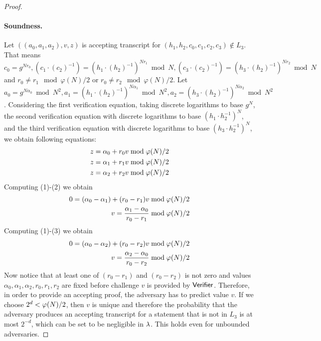 \begin{proof}
\paragraph{Soundness.} Let $((a_0, a_1, a_2), v, z)$ is accepting transcript for $(h_1, h_2, c_0, c_1, c_2, c_3) \notin L_3$. That means $c_0 = g^{Nr_0}, (c_1\cdot (c_2)^{-1}) = (h_1\cdot (h_2)^{-1})^{Nr_1} \bmod N, (c_3\cdot (c_2)^{-1}) = (h_3\cdot (h_2)^{-1})^{Nr_2} \bmod N$ and $r_0 \neq r_1 \mod \varphi(N)/2$ or $r_0 \neq r_2 \mod \varphi(N)/2$. Let $a_0 = g^{N\alpha_0} \bmod N^2, a_1 = (h_1\cdot (h_2)^{-1})^{N\alpha_1} \bmod N^2, a_2 = (h_3\cdot (h_2)^{-1})^{N\alpha_2} \bmod N^2$. Considering the first verification equation, taking discrete logarithms to base $g^N$, the second verification equation with discrete logarithms to base $(h_1 \cdot h_2^{-1})^N$, and the third verification equation with discrete logarithms to base $(h_3 \cdot h_2^{-1})^N$, we obtain following equations:
\begin{align}
z = \alpha_0 + r_0 v \bmod \varphi(N)/2\\
z = \alpha_1 + r_1 v \bmod \varphi(N)/2 \\
z = \alpha_2 + r_2 v \bmod \varphi(N)/2
\end{align}
Computing (1)-(2) we obtain
\begin{align*}
0 = (\alpha_0 - \alpha_1)+ (r_0-r_1)v \bmod \varphi(N)/2 \\
v = \frac{\alpha_1 - \alpha_0}{r_0-r_1} \bmod \varphi(N)/2
\end{align*}
Computing (1)-(3) we obtain
\begin{align*}
0 = (\alpha_0 - \alpha_2)+ (r_0-r_2)v \bmod \varphi(N)/2 \\
v = \frac{\alpha_2 - \alpha_0}{r_0-r_2} \bmod \varphi(N)/2
\end{align*}
Now notice that at least one of $(r_0 - r_1)$ and $(r_0 - r_2)$ is not zero and values $\alpha_0, \alpha_1, \alpha_2, r_0, r_1, r_2$ are fixed before challenge $v$ is provided by $\mathsf{Verifier}$. Therefore, in order to provide an accepting proof, the adversary has to predict value $v$. If we choose $2^d < \varphi(N)/2$, then $v$ is unique and therefore the probability that the adversary produces an accepting transcript for a statement that is not in $L_3$ is at most $2^{-d}$, which can be set to be negligible in $\lambda$. This holds even for unbounded adversaries. 


\end{proof}
